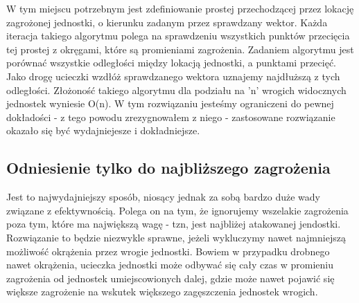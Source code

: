 \documentclass[12pt]{report}
\begin{document}
W tym miejscu potrzebnym jest zdefiniowanie prostej przechodzącej przez lokację zagrożonej jednostki, o kierunku zadanym przez sprawdzany wektor. Każda iteracja takiego algorytmu polega na sprawdzeniu wszystkich punktów przecięcia tej prostej z okręgami, które są promieniami zagrożenia. Zadaniem algorytmu jest porównać wszystkie odległości między lokacją jednostki, a punktami przecięć. Jako drogę ucieczki wzdłóż sprawdzanego wektora uznajemy najdłuższą z tych odległości. Złożoność takiego algorytmu dla podziału na 'n' wrogich widocznych jednostek wyniesie O(n). W tym rozwiązaniu jesteśmy ograniczeni do pewnej dokładości - z tego powodu zrezygnowałem z niego - zastosowane rozwiązanie okazało się być wydajniejesze i dokładniejsze.

\subsection{Odniesienie tylko do najbliższego zagrożenia}
Jest to najwydajniejszy sposób, niosący jednak za sobą bardzo duże wady związane z efektywnością. Polega on na tym, że ignorujemy wszelakie zagrożenia poza tym, które ma największą wagę - tzn, jest najbliżej atakowanej jendostki. Rozwiązanie to będzie niezwykle sprawne, jeżeli wykluczymy nawet najmniejszą możliwość okrążenia przez wrogie jednostki. Bowiem w przypadku drobnego nawet okrążenia, ucieczka jednostki może odbywać się cały czas w promieniu zagrożenia od jednostek umiejscowionych dalej, gdzie może nawet pojawić się większe zagrożenie na wskutek większego zagęszczenia jednostek wrogich.
\end{document}
